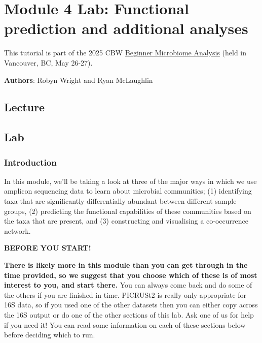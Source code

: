 \documentclass[
]{book}
\newenvironment{redbox}{
  \definecolor{shadecolor}{RGB}{243, 154, 157}
  \color{white}
  \begin{shaded}}
 {\end{shaded}}
\begin{document}
\chapter{Module 4 Lab: Functional prediction and additional analyses}\label{module-4-lab-functional-prediction-and-additional-analyses}

This tutorial is part of the 2025 CBW \href{https://bioinformaticsdotca.github.io/BMB_2025/}{Beginner Microbiome Analysis} (held in Vancouver, BC, May 26-27).

\textbf{Authors}: Robyn Wright and Ryan McLaughlin

\section{Lecture}\label{lecture-3}

\section{Lab}\label{lab-1}

\subsection{Introduction}\label{introduction-3}

In this module, we'll be taking a look at three of the major ways in which we use amplicon sequencing data to learn about microbial communities; (1) identifying taxa that are significantly differentially abundant between different sample groups, (2) predicting the functional capabilities of these communities based on the taxa that are present, and (3) constructing and visualising a co-occurrence network.

\begin{redbox}

\begin{center}
\textbf{BEFORE YOU START!}

\end{center}

\textbf{There is likely more in this module than you can get through in the time provided, so we suggest that you choose which of these is of most interest to you, and start there.} You can always come back and do some of the others if you are finished in time. PICRUSt2 is really only appropriate for 16S data, so if you used one of the other datasets then you can either copy across the 16S output or do one of the other sections of this lab. Ask one of us for help if you need it! You can read some information on each of these sections below before deciding which to run.

\end{redbox}
\end{document}
